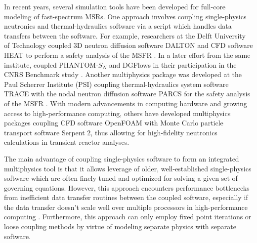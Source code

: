 In recent years, several simulation tools have been developed for full-core
modeling of fast-spectrum \glspl{MSR}. One approach involves coupling
single-physics neutronics and thermal-hydraulics software via a script which
handles data transfers between the software. For example, researchers at
the Delft University of Technology coupled 3D neutron diffusion software
DALTON \citep{boer_validation_2010} and CFD software HEAT
\citep{de_zwaan_static_2007} to perform a safety analysis of the \gls{MSFR}
\citep{fiorina_modelling_2014}. In a later effort from the same institute,
\cite{tiberga_discontinuous_2019} coupled PHANTOM-$S_N$ and DGFlows
in their participation in the
CNRS Benchmark study \citep{tiberga_results_2020}. Another multiphysics
package was developed at the Paul Scherrer Institute (PSI) coupling
thermal-hydraulics system software TRACE \citep{nrc_trace_2007} with the nodal
neutron diffusion software PARCS \citep{downar_parcs_2010} for the safety
analysis of the \gls{MSFR} \citep{pettersen_coupled_2016}. With modern
advancements in computing hardware and growing access to high-performance
computing, others \citep{laureau_transient_2017,blanco_neutronic_2020} have
developed multiphysics packages coupling CFD software
OpenFOAM with Monte Carlo particle transport software Serpent 2, thus allowing
for high-fidelity neutronics calculations in transient reactor analyses.

The main advantage of coupling single-physics software to form an integrated
multiphysics tool is that it allows leverage of older, well-established
single-physics software which are often finely tuned and optimized for solving
a given set of governing equations. However, this approach encounters
performance bottlenecks from inefficient data transfer routines between the
coupled software, especially if the data transfer doesn't scale well over
multiple processors in high-performance computing
\cite{keyes_multiphysics_2013}. Furthermore, this approach can only employ
fixed point iterations or loose coupling methods by virtue of modeling
separate physics with separate software.

